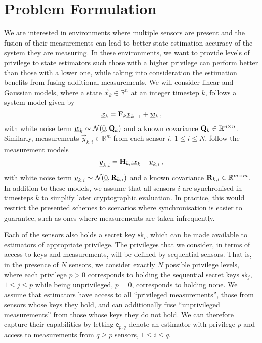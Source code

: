 \documentclass[conference]{IEEEtran}
\begin{document}
\section{Problem Formulation}\label{sec:prob}
We are interested in environments where multiple sensors are present and the fusion of their measurements can lead to better state estimation accuracy of the system they are measuring. In these environments, we want to provide levels of privilege to state estimators such those with a higher privilege can perform better than those with a lower one, while taking into consideration the estimation benefits from fusing additional measurements. We will consider linear and Gaussian models, where a state $\vec{x}_k \in \mathbb{R}^n$ at an integer timestep $k$, follows a system model given by
\begin{equation}
  {\underline{x}}_k = {{\mathbf{F}}}_k {\underline{x}}_{k-1} + {\underline{w}}_k\,,
\end{equation}
with white noise term ${\underline{w}}_k \sim \mathcal{N}({\underline{0}},{{\mathbf{Q}}}_k)$ and a known covariance ${{\mathbf{Q}}}_k \in \mathbb{R}^{n \times n}$. Similarly, measurements $\vec{y}_{k,i} \in \mathbb{R}^m$ from each sensor $i$, $1\leq i\leq N$, follow the measurement models
\begin{equation}
  {\underline{y}}_{k,i} = {{\mathbf{H}}}_{k,i} {\underline{x}}_k + {\underline{v}}_{k,i}\,,
\end{equation}
with white noise term ${\underline{v}}_{k,i} \sim \mathcal{N}({\underline{0}},{{\mathbf{R}}}_{k,i})$ and a known covariance ${{\mathbf{R}}}_{k,i} \in \mathbb{R}^{m \times m}$. In addition to these models, we assume that all sensors $i$ are synchronised in timesteps $k$ to simplify later cryptographic evaluation. In practice, this would restrict the presented schemes to scenarios where synchronisation is easier to guarantee, such as ones where measurements are taken infrequently.

Each of the sensors also holds a secret key $\mathsf{sk}_i$, which can be made available to estimators of appropriate privilege. The privileges that we consider, in terms of access to keys and measurements, will be defined by sequential sensors. That is, in the presence of $N$ sensors, we consider exactly $N$ possible privilege levels, where each privilege $p>0$ corresponds to holding the sequential secret keys $\mathsf{sk}_j$, $1\leq j \leq p$ while being unprivileged, $p=0$, corresponds to holding none. We assume that estimators have access to all ``privileged measurements'', those from sensors whose keys they hold, and can additionally fuse ``unprivileged measurements'' from those whose keys they do not hold. We can therefore capture their capabilities by letting $\mathsf{e}_{p,q}$ denote an estimator with privilege $p$ and access to measurements from $q\geq p$ sensors, $1\leq i \leq q$.
\end{document}

